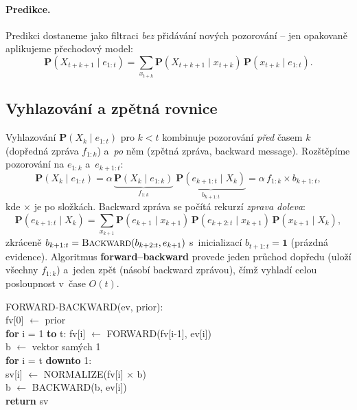 \paragraph{Predikce.} Predikci dostaneme jako filtraci \emph{bez} přidávání nových pozorování -- jen opakovaně aplikujeme přechodový model:
\[
  \mathbf{P}(X_{t+k+1}\mid e_{1:t}) = \sum_{x_{t+k}} \mathbf{P}(X_{t+k+1}\mid x_{t+k})\,\mathbf{P}(x_{t+k}\mid e_{1:t}).
\]

\subsection{Vyhlazování a zpětná rovnice}

Vyhlazování $\mathbf{P}(X_k\mid e_{1:t})$ pro $k<t$ kombinuje pozorování \emph{před} časem $k$ (dopředná zpráva $f_{1:k}$) a~\emph{po} něm (zpětná zpráva, backward message). Rozštěpíme pozorování na $e_{1:k}$ a~$e_{k+1:t}$:
\[
  \mathbf{P}(X_k\mid e_{1:t}) = \alpha\,\underbrace{\mathbf{P}(X_k\mid e_{1:k})}_{f_{1:k}}\;\underbrace{\mathbf{P}(e_{k+1:t}\mid X_k)}_{b_{k+1:t}} = \alpha\, f_{1:k}\times b_{k+1:t},
\]
kde $\times$ je po složkách. Backward zpráva se počítá rekurzí \emph{zprava doleva}:
\[
  \mathbf{P}(e_{k+1:t}\mid X_k) = \sum_{x_{k+1}} \mathbf{P}(e_{k+1}\mid x_{k+1})\,\mathbf{P}(e_{k+2:t}\mid x_{k+1})\,\mathbf{P}(x_{k+1}\mid X_k),
\]
zkráceně $b_{k+1:t} = \textsc{Backward}(b_{k+2:t},e_{k+1})$ s~inicializací $b_{t+1:t}=\mathbf{1}$ (prázdná evidence). Algoritmus \textbf{forward--backward} provede jeden průchod dopředu (uloží všechny $f_{1:k}$) a~jeden zpět (násobí backward zprávou), čímž vyhladí celou posloupnost v~čase $O(t)$.

\begin{algo}
\ttfamily\small
FORWARD-BACKWARD(ev, prior):\\
\hspace*{1.5em}fv[0] $\leftarrow$ prior \\
\hspace*{1.5em}\textbf{for} i = 1 \textbf{to} t: fv[i] $\leftarrow$ FORWARD(fv[i-1], ev[i])\\
\hspace*{1.5em}b $\leftarrow$ vektor samých 1 \\
\hspace*{1.5em}\textbf{for} i = t \textbf{downto} 1:\\
\hspace*{3em}sv[i] $\leftarrow$ NORMALIZE(fv[i] $\times$ b)\\
\hspace*{3em}b $\leftarrow$ BACKWARD(b, ev[i])\\
\hspace*{1.5em}\textbf{return} sv 
\end{algo}

